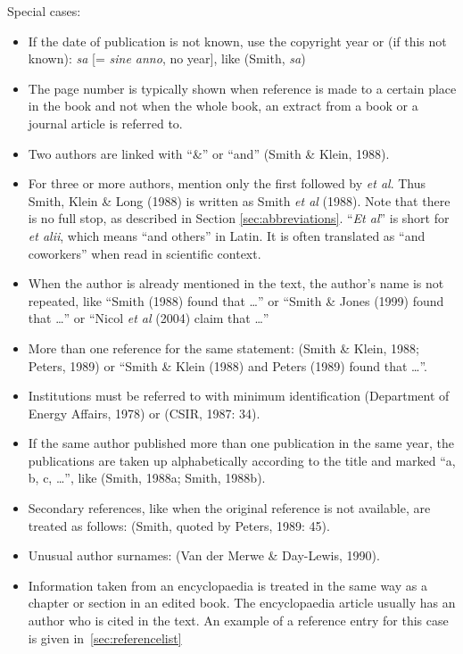 \documentclass[a5paper, 10pt]{article}
\begin{document}
Special cases:
\begin{itemize}
\item If the date of publication is not known, use the copyright year
  or (if this not known): \emph{sa} [= \emph{sine anno}, no year], like (Smith,
  \emph{sa})
\item The page number is typically shown when reference is made to a
  certain place in the book and not when the whole book, an extract
  from a book or a journal article is referred to.
\item Two authors are linked with ``\&'' or ``and'' (Smith \& Klein, 1988).
\item For three or more authors, mention only the first followed by \emph{et al}.
  Thus Smith, Klein \& Long (1988) is written as Smith \emph{et al} (1988). Note that 
  there is no full stop, as described in Section \ref{sec:abbreviations}.  
  ``\emph{Et al}'' is short for \emph{et alii}, which means ``and others'' in Latin. 
  It is often translated as ``and coworkers'' when read in scientific context.
\item When the author is already mentioned in the text, the author's
  name is not repeated, like ``Smith (1988) found that \dots'' or
  ``Smith \& Jones (1999) found that \dots'' or ``Nicol \emph{et al} (2004)
  claim that \dots''
\item More than one reference for the same statement: (Smith \& Klein,
  1988; Peters, 1989) or ``Smith \& Klein (1988) and Peters
  (1989) found that \dots''.
\item Institutions must be referred to with minimum identification
  (Department of Energy Affairs, 1978) or (CSIR, 1987: 34).
\item If the same author published more than one publication in the
  same year, the publications are taken up alphabetically according to
  the title and marked ``a, b, c, \dots'', like (Smith, 1988a; Smith,
  1988b).
\item Secondary references, like when the original reference is not
  available, are treated as follows: (Smith, quoted by Peters, 1989:
  45).
\item Unusual author surnames: (Van der Merwe \& Day-Lewis, 1990).
\item Information taken from an encyclopaedia is treated in the same
  way as a chapter or section in an edited book.  The encyclopaedia
  article usually has an author who is cited in the text.  An example
  of a reference entry for this case is given in~\ref{sec:referencelist}
\end{itemize}
\end{document}
